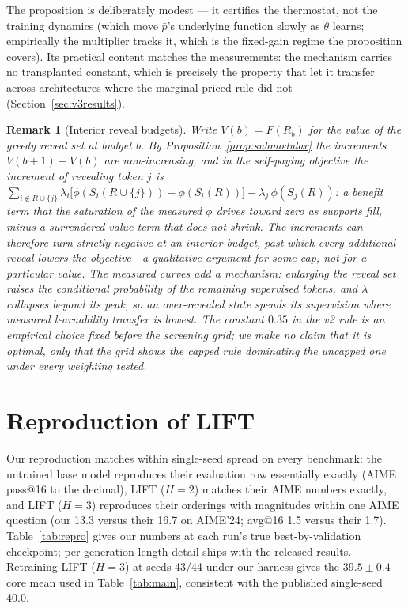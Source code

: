 \documentclass{article} %
\newtheorem{remark}{Remark}
\begin{document}
The proposition is deliberately modest --- it certifies the thermostat, not the training dynamics (which move $\bar p$'s underlying function slowly as $\theta$ learns; empirically the multiplier tracks it, which is the fixed-gain regime the proposition covers). Its practical content matches the measurements: the mechanism carries no transplanted constant, which is precisely the property that let it transfer across architectures where the marginal-priced rule did not (Section~\ref{sec:v3results}).

\begin{remark}[Interior reveal budgets]
\label{rem:budget}
Write $V(b) = F(R_b)$ for the value of the greedy reveal set at budget $b$. By Proposition~\ref{prop:submodular} the increments $V(b{+}1) - V(b)$ are non-increasing, and in the self-paying objective the increment of revealing token $j$ is
$\sum_{i \notin R \cup \{j\}} \lambda_i \big[\phi(S_i(R \cup \{j\})) - \phi(S_i(R))\big] - \lambda_j\, \phi(S_j(R))$:
a benefit term that the saturation of the measured $\phi$ drives toward zero as supports fill, minus a surrendered-value term that does not shrink. The increments can therefore turn strictly negative at an interior budget, past which every additional reveal lowers the objective---a qualitative argument for \emph{some} cap, not for a particular value. The measured curves add a mechanism: enlarging the reveal set raises the conditional probability of the remaining supervised tokens, and $\lambda$ collapses beyond its peak, so an over-revealed state spends its supervision where measured learnability transfer is lowest. The constant $0.35$ in the v2 rule is an empirical choice fixed before the screening grid; we make no claim that it is optimal, only that the grid shows the capped rule dominating the uncapped one under every weighting tested.
\end{remark}

\section{Reproduction of LIFT}
\label{app:repro}
Our reproduction matches \citet{lift2026} within single-seed spread on every benchmark: the untrained base model reproduces their evaluation row essentially exactly (AIME pass@16 to the decimal), LIFT ($H{=}2$) matches their AIME numbers exactly, and LIFT ($H{=}3$) reproduces their orderings with magnitudes within one AIME question (our 13.3 versus their 16.7 on AIME'24; avg@16 1.5 versus their 1.7). Table~\ref{tab:repro} gives our numbers at each run's true best-by-validation checkpoint; per-generation-length detail ships with the released results. Retraining LIFT ($H{=}3$) at seeds 43/44 under our harness gives the $39.5 \pm 0.4$ core mean used in Table~\ref{tab:main}, consistent with the published single-seed 40.0.
\end{document}
